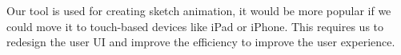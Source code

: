 Our tool is used for creating sketch animation, it would be more popular if we could move it to touch-based devices like iPad or iPhone. This requires us to redesign the user UI and improve the efficiency to improve the user experience.





\newpage




